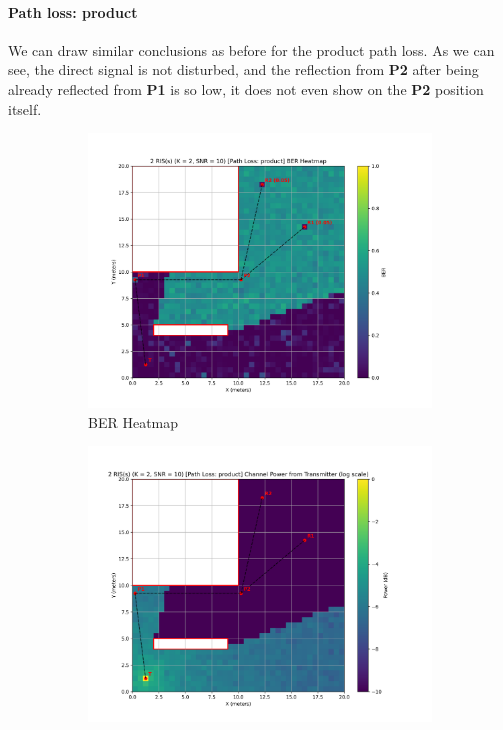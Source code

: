 \paragraph*{Path loss: product}
We can draw similar conclusions as before for the product path loss. As we can see, the direct signal is not disturbed, and the reflection from \textbf{P2} after being already reflected from \textbf{P1} is so low, it does not even show on the \textbf{P2} position itself.

\begin{figure}[H]
  \centering
  \begin{subfigure}[b]{0.48\textwidth}
    \centering
    \includegraphics[width=\textwidth]{imgs/heatmap-simulations/2 RIS(s) (K = 2, SNR = 10) [Path Loss_ product] BER Heatmap.png}
    \caption{BER Heatmap}
  \end{subfigure}
  \hfill
  \begin{subfigure}[b]{0.48\textwidth}
    \centering
    \includegraphics[width=\textwidth]{imgs/heatmap-simulations/2 RIS(s) (K = 2, SNR = 10) [Path Loss_ product] Channel Power from Transmitter (log scale).png}

\end{subfigure}
\end{figure}
